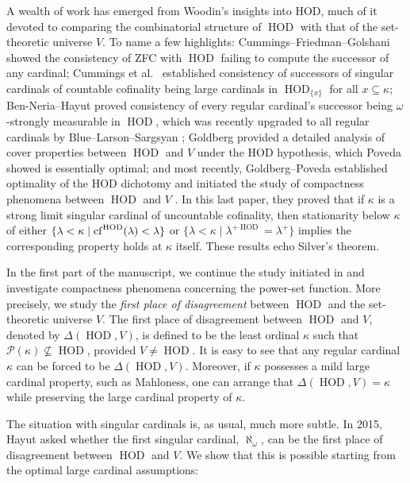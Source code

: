 \documentclass[11pt]{amsart}
\theoremstyle{definition}
\theoremstyle{remark}
\DeclareMathOperator{\HOD}{HOD}
\newcommand{\cf}{{\rm cf}}
\newcommand\tom[1]{\marginpar{Tom: #1}}
\begin{document}
\smallskip
 
A wealth of work has emerged from Woodin's insights into HOD, much of it devoted to
comparing the combinatorial structure of $\HOD$ with that of the set-theoretic universe $V$.
To name a few highlights: Cummings--Friedman--Golshani \cite{CumFriGol} showed the
consistency of ZFC with $\HOD$ failing to compute the successor of any cardinal;
Cummings et al.\ \cite{AIM} established consistency of successors of singular cardinals of
countable cofinality being large cardinals in $\HOD_{\{x\}}$ for all $x \subseteq \kappa$;
Ben-Neria--Hayut \cite{BenHay} proved consistency of every regular cardinal's successor
being $\omega$-strongly measurable in $\HOD$, which was recently upgraded to all regular cardinals by  Blue--Larson--Sargsyan \cite{BlueLarsonSargsyan}; Goldberg \cite{Gol} provided a detailed
analysis of cover properties between $\HOD$ and $V$ under the HOD hypothesis, which Poveda
\cite{PovOmega} showed is essentially optimal; and most recently, Goldberg--Poveda
 established optimality of the HOD dichotomy \cite{GOP} and initiated the study of
compactness phenomena between $\HOD$ and $V$ \cite{GolPov}. In this last paper, they proved that if
$\kappa$ is a strong limit singular cardinal of uncountable cofinality, then stationarity
below $\kappa$ of either $\{\lambda<\kappa\mid \cf^{\HOD}(\lambda)<\lambda\}$ or
$\{\lambda<\kappa\mid \lambda^{+\HOD}=\lambda^+\}$ implies the corresponding property holds at
$\kappa$ itself. These results echo Silver's theorem. %
 
\smallskip
 
 
In the first part of the manuscript, we continue the study initiated in \cite{GolPov} and investigate compactness phenomena concerning the power-set function. More precisely, we study the \emph{first place of disagreement} between $\HOD$ and the set-theoretic universe $V$. The first place of disagreement between $\HOD$ and $V$, denoted by $\Delta(\HOD,V)$, is defined to be the least ordinal $\kappa$ such that $\mathcal{P}(\kappa)\nsubseteq\HOD$, provided $V\neq\HOD$. It is easy to see that any regular cardinal $\kappa$ can be forced to be $\Delta(\HOD,V)$. Moreover, if $\kappa$ possesses a mild large cardinal property, such as Mahloness, one can arrange that $\Delta(\HOD,V)=\kappa$ while preserving the large cardinal property of $\kappa$.

 
\smallskip

The situation with singular cardinals is, as usual,  much more subtle. In 2015, Hayut asked whether the first singular cardinal, $\aleph_\omega$, can be the first place of disagreement between $\HOD$ and $V$. 
We show that this is possible starting from the optimal large cardinal assumptions:
 
\end{document}
